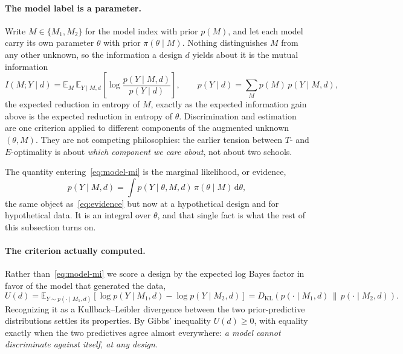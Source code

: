 \documentclass[10pt]{article}
\begin{document}
\paragraph{The model label is a parameter.}
Write $M \in \{M_1, M_2\}$ for the model index with prior $p(M)$, and let each model carry
its own parameter $\theta$ with prior $\pi(\theta \mid M)$. Nothing distinguishes $M$ from
any other unknown, so the information a design $d$ yields about it is the mutual information
%
\begin{equation}
I(M; Y \mid d)
= \mathbb{E}_{M}\,\mathbb{E}_{Y \mid M, d}
  \left[\log \frac{p(Y \mid M, d)}{p(Y \mid d)}\right],
\qquad
p(Y \mid d) = \sum_{M} p(M)\, p(Y \mid M, d),
\label{eq:model-mi}
\end{equation}
%
the expected reduction in entropy of $M$, exactly as the expected information gain above is
the expected reduction in entropy of $\theta$. Discrimination and estimation are one criterion
applied to different components of the augmented unknown $(\theta, M)$. They are not competing
philosophies: the earlier tension between $T$- and $E$-optimality is about \emph{which
component we care about}, not about two schools.

The quantity entering~\eqref{eq:model-mi} is the marginal likelihood, or evidence,
%
\begin{equation}
p(Y \mid M, d) = \int p(Y \mid \theta, M, d)\, \pi(\theta \mid M)\, \mathrm{d}\theta ,
\label{eq:model-evidence}
\end{equation}
%
the same object as~\eqref{eq:evidence} but now at a hypothetical design and for hypothetical
data. It is an integral over $\theta$, and that single fact is what the rest of this
subsection turns on.

\paragraph{The criterion actually computed.}
Rather than~\eqref{eq:model-mi} we score a design by the expected log Bayes factor in favor
of the model that generated the data,
%
\begin{equation}
U(d)
= \mathbb{E}_{Y \sim p(\cdot \mid M_1, d)}
  \left[\log p(Y \mid M_1, d) - \log p(Y \mid M_2, d)\right]
= D_{\mathrm{KL}}\!\left(p(\cdot \mid M_1, d)\,\|\,p(\cdot \mid M_2, d)\right).
\label{eq:elbf}
\end{equation}
%
Recognizing it as a Kullback--Leibler divergence between the two prior-predictive
distributions settles its properties. By Gibbs' inequality $U(d) \ge 0$, with equality exactly
when the two predictives agree almost everywhere: \emph{a model cannot discriminate against
itself, at any design}.
\end{document}
